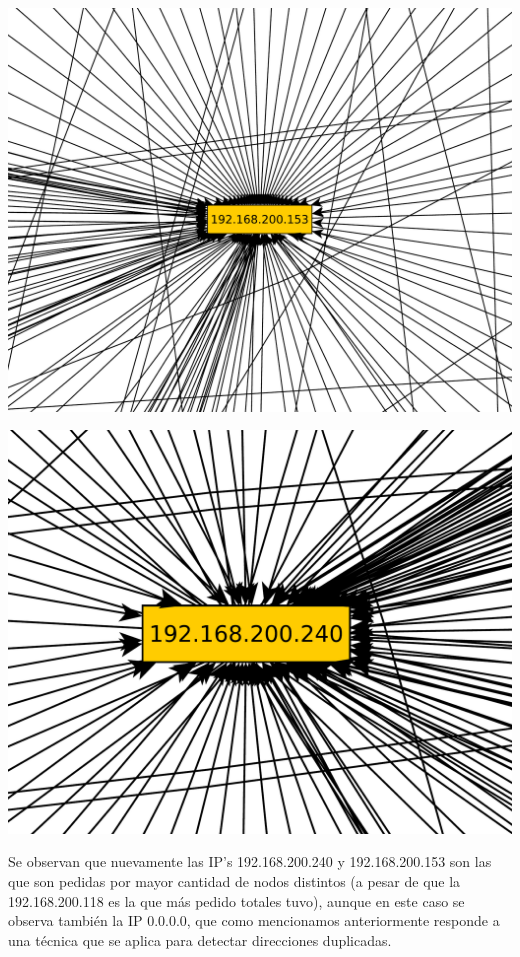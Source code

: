 \includegraphics[scale=0.3,clip=true,trim=20 0 0 0]{graphics/laburomediano153.pdf}

\includegraphics[scale=0.3,clip=true,trim=20 0 0 0]{graphics/laburomediano254.pdf}


\indent Se observan que nuevamente las IP's 192.168.200.240 y 192.168.200.153 son las que son pedidas por mayor cantidad de nodos distintos (a pesar de que la 192.168.200.118 es la que más pedido totales tuvo), aunque en este caso se observa también la IP 0.0.0.0, que como mencionamos anteriormente responde a una técnica que se aplica para detectar direcciones duplicadas.\\

